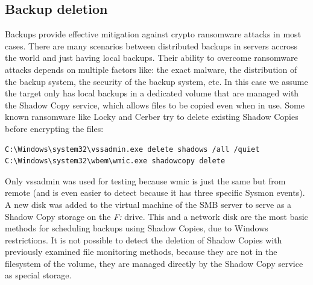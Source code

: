 \subsection{Backup deletion}
Backups provide effective mitigation against crypto ransomware attacks in most cases.
There are many scenarios between distributed backups in servers accross the world and just having local backups.
Their ability to overcome ransomware attacks depends on multiple factors like: the exact malware, the distribution of the backup system, the security of the backup system, etc.
\linej
In this case we assume the target only has local backups in a dedicated volume that are managed with the Shadow Copy service, which allows files to be copied even when in use.
Some known ransomware like Locky and Cerber try to delete existing Shadow Copies before encrypting the files\cite{ransomware_oReilly}:
\begin{lstlisting}[style=PS]
C:\Windows\system32\vssadmin.exe delete shadows /all /quiet
C:\Windows\system32\wbem\wmic.exe shadowcopy delete
\end{lstlisting}
\linej
Only vssadmin was used for testing because wmic is just the same but from remote (and is even easier to detect because it has three specific Sysmon events).
A new disk was added to the virtual machine of the SMB server to serve as a Shadow Copy storage on the \textit{F:} drive.
This and a network disk are the most basic methods for scheduling backups using Shadow Copies, due to Windows restrictions.
\linej
\linej
It is not possible to detect the deletion of Shadow Copies with previously examined file monitoring methods,
because they are not in the filesystem of the volume, they are managed directly by the Shadow Copy service as special storage.

